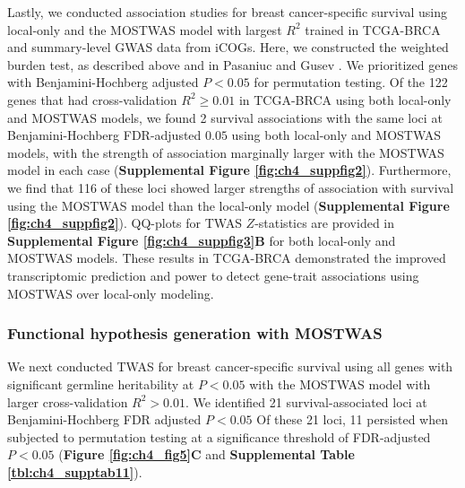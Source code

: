 Lastly, we conducted association studies
for breast cancer-specific survival
using local-only and the MOSTWAS model with largest
$R^2$ trained
in TCGA-BRCA and summary-level GWAS
data from iCOGs.
Here, we constructed the weighted
burden test, as described above and in Pasaniuc
\etal{} and Gusev \etal{}
\cite{Pasaniuc2014FastEnrichment,Gusev2016}.
We prioritized genes with 
Benjamini-Hochberg \cite{Benjamini1995} adjusted $P < 0.05$
for permutation testing.
Of the 122 genes
that had cross-validation $R^2 \geq 0.01$
in TCGA-BRCA using both local-only
and MOSTWAS models, we found 2 survival
associations with the same loci 
at Benjamini-Hochberg FDR-adjusted 
$0.05$ using both local-only
and MOSTWAS models,
with the strength
of association marginally larger with
the MOSTWAS model in each case (\textbf{Supplemental Figure
\ref{fig:ch4_suppfig2}}).
Furthermore, we find that 116 of these loci
showed larger strengths of association
with survival using the MOSTWAS model
than the local-only model (\textbf{Supplemental Figure
\ref{fig:ch4_suppfig2}}).
QQ-plots for TWAS $Z$-statistics
are provided in \textbf{Supplemental Figure
\ref{fig:ch4_suppfig3}B}
for both local-only and MOSTWAS models.
These results in TCGA-BRCA demonstrated the improved
transcriptomic prediction and power
to detect gene-trait associations using MOSTWAS
over local-only modeling.

\subsubsection{Functional hypothesis
generation with MOSTWAS}

We next conducted TWAS
for breast cancer-specific 
survival using all genes
with significant germline
heritability at $P < 0.05$
with the MOSTWAS model with larger
cross-validation $R^2 > 0.01$.
We identified 21 survival-associated loci
at Benjamini-Hochberg FDR adjusted $P < 0.05$
Of these 21 loci, 11 
persisted when subjected to permutation
testing at a significance threshold of FDR-adjusted $P < 0.05$
(\textbf{Figure \ref{fig:ch4_fig5}C}
and \textbf{Supplemental Table \ref{tbl:ch4_supptab11}}).

